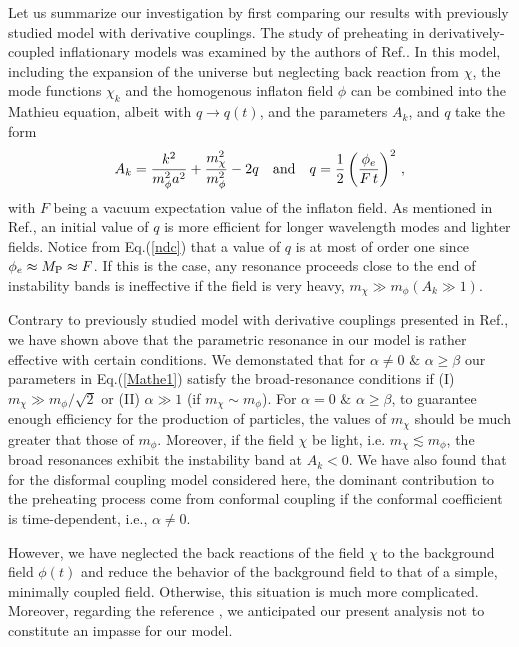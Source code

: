 \documentclass[aps,prd,amsmath,amssymb,preprintnumbers,onecolumn,11pt,nofootinbib]{revtex4}
\begin{document}
Let us summarize our investigation by first comparing our results with previously studied model with derivative couplings. The study of preheating in derivatively-coupled inflationary models was examined by the authors of Ref.\cite{ArmendarizPicon:2007iv}. In this model, including the expansion of the universe but neglecting back reaction from $\chi$, the mode functions $\chi_{k}$ and the homogenous inflaton field $\phi$ can be combined into the Mathieu equation, albeit with $q\rightarrow q(t)$, and the parameters $A_{k}$, and $q$ take the form
\begin{eqnarray}
A_{k} = \frac{k^{2}}{m^{2}_{\phi}a^{2}} + \frac{m^{2}_{\chi}}{m^{2}_{\phi}} -2q \quad{\rm and}\quad q = \frac{1}{2}\left(\frac{\phi_{e}}{F\,t}\right)^{2}\,,\label{ndc}
\end{eqnarray}
with $F$ being a vacuum expectation value of the inflaton field. As mentioned in Ref.\cite{ArmendarizPicon:2007iv}, an initial value of $q$ is more efficient for longer wavelength modes and lighter fields. Notice from Eq.(\ref{ndc}) that a value of $q$ is at most of order one since $\phi_{e} \approx M_{\rm P} \approx F$. If this is the case, any resonance proceeds close to the end of instability bands is ineffective if the field is very heavy, $m_{\chi}\gg m_{\phi} (A_{k}\gg 1)$. 

Contrary to previously studied model with derivative couplings presented in Ref.\cite{ArmendarizPicon:2007iv}, we have shown above that the parametric resonance in our model is rather effective with certain conditions.  We demonstated that for $\alpha\neq 0\,\,\&\,\,\alpha\geq \beta$ our parameters in Eq.(\ref{Mathe1}) satisfy the broad-resonance conditions if (I) $m_{\chi}\gg m_{\phi}/\sqrt{2}$ or (II) $\alpha\gg 1$ (if $m_{\chi}\sim m_{\phi}$). For $\alpha=0\,\,\&\,\,\alpha\geq \beta$, to guarantee enough efficiency for the production of particles, the values of $m_{\chi}$ should be much greater that those of $m_{\phi}$. Moreover, if the field $\chi$ be light, i.e. $m_{\chi} \lesssim m_{\phi}$, the broad resonances exhibit the instability band at $A_{k} <0$. We have also found that for the disformal coupling model considered here,
the dominant contribution to the preheating process come from conformal coupling if the conformal coefficient is time-dependent, i.e., $\alpha \neq 0$.

However, we have neglected the back reactions of the field $\chi$ to the background field $\phi (t)$ and reduce the behavior of the background field to that of a simple, minimally coupled field. Otherwise, this situation is much more complicated.  Moreover, regarding the reference \cite{ArmendarizPicon:2007iv,Tsujikawa:1999iv}, we anticipated our present analysis not to constitute an impasse for our model.
\end{document}
